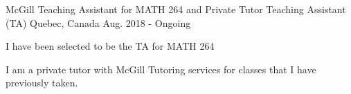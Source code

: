 \begin{cventries}
  \cventry
    {McGill Teaching Assistant for MATH 264 and Private Tutor}
    {Teaching Assistant (TA)}
    {Quebec, Canada}
    {Aug. 2018 - Ongoing}
    {
      \begin{cvitems}
        \item {I have been selected to be the TA for MATH 264}
        \item {I am a private tutor with McGill Tutoring services for classes that I have previously taken.}
      \end{cvitems}
    }
\end{cventries}
